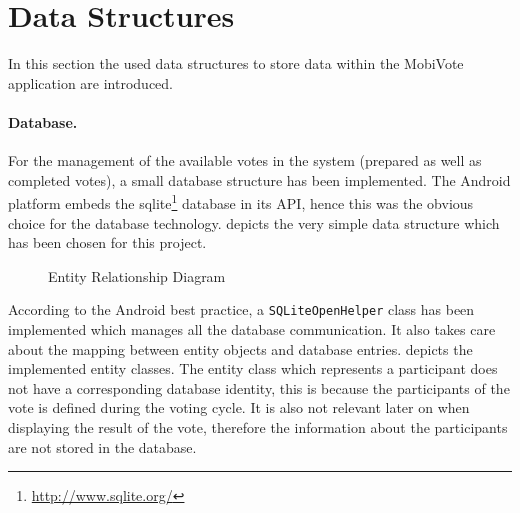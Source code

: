 \documentclass[numbers=noenddot, abstract=on, a4paper, headsepline,
footsepline, oneside, draft=off]{scrreprt}
\begin{document}
\section{Data Structures} 
\label{sec:datastructures}
In this section the used data structures to store data within the MobiVote
application are introduced.

\paragraph{Database.} For the management of the available votes in the system
(prepared as well as completed votes), a small database structure has been implemented. The Android
platform embeds the sqlite\footnote{\url{http://www.sqlite.org/}} database in
its API, hence this was the obvious choice for the database technology.  depicts the very simple data
structure which has been chosen for this project.

\begin{figure}[htbp]
	\centering
	\caption{Entity Relationship Diagram}
	\label{fig:erd}
\end{figure}

According to the Android best practice, a \texttt{SQLiteOpenHelper} class has
been implemented which manages all the database communication. It also takes
care about the mapping between entity objects and database entries.
 depicts the implemented entity classes. The entity class
which represents a participant does not have a corresponding database identity,
this is because the participants of the vote is defined during the voting cycle.
It is also not relevant later on when displaying the result of the vote,
therefore the information about the participants are not stored in the database.
\end{document}
